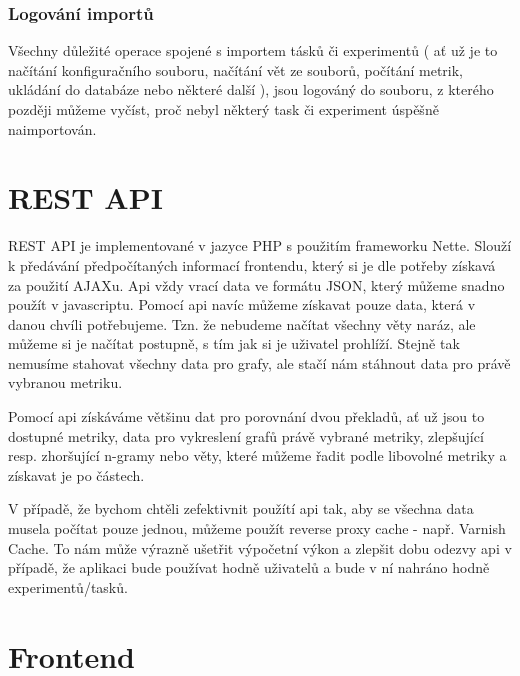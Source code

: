 \subsubsection{Logování importů}
Všechny důležité operace spojené s importem tásků či experimentů
  ( ať už je to načítání konfiguračního souboru, načítání vět ze souborů,
  počítání metrik, ukládání do databáze nebo některé další ), 
  jsou logováný do souboru,
  z kterého později můžeme vyčíst,
  proč nebyl některý task či experiment úspěšně naimportován. 


\section{REST API}
REST API je implementované v jazyce PHP s použitím frameworku Nette.
Slouží k předávání předpočítaných informací frontendu,
  který si je dle potřeby získavá za použití AJAXu.
Api vždy vrací data ve formátu JSON,
  který můžeme snadno použít v javascriptu.
Pomocí api navíc můžeme získavat pouze data,
  která v danou chvíli potřebujeme.
Tzn. že nebudeme načítat všechny věty naráz,
  ale můžeme si je načítat postupně,
  s tím jak si je uživatel prohlíží.
Stejně tak nemusíme stahovat všechny data pro grafy,
  ale stačí nám stáhnout data pro právě vybranou metriku.

Pomocí api získáváme většinu dat pro porovnání dvou překladů,
  ať už jsou to dostupné metriky,
  data pro vykreslení grafů právě vybrané metriky,
  zlepšující resp. zhoršující n-gramy
  nebo věty,
  které můžeme řadit podle libovolné metriky a získavat je po částech.

V případě, že bychom chtěli zefektivnit použítí api tak,
  aby se všechna data musela počítat pouze jednou,
  můžeme použít reverse proxy cache - např. Varnish Cache.
To nám může výrazně ušetřit výpočetní výkon a zlepšit dobu odezvy api v případě,
  že aplikaci bude používat hodně uživatelů
  a bude v ní nahráno hodně experimentů/tasků.

\section{Frontend}





